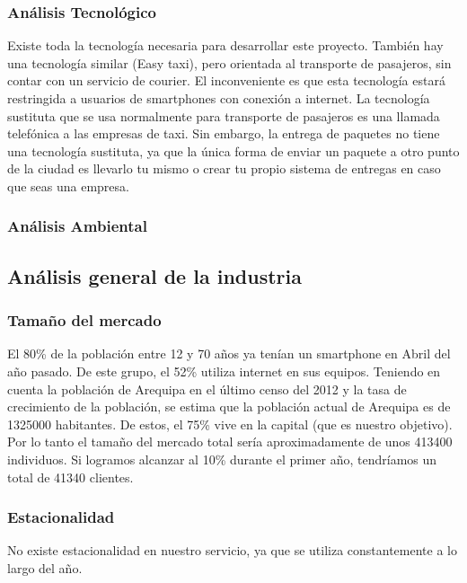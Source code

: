 \subsubsection{Análisis Tecnológico}
Existe toda la tecnología necesaria para desarrollar este proyecto. También hay una tecnología similar (Easy taxi), pero orientada al transporte de pasajeros, sin contar con un servicio de courier. El inconveniente es que esta tecnología estará restringida a usuarios de smartphones con conexión a internet. La tecnología sustituta que se usa normalmente para transporte de pasajeros es una llamada telefónica a las empresas de taxi. Sin embargo, la entrega de paquetes no tiene una tecnología sustituta, ya que la única forma de enviar un paquete a otro punto de la ciudad es llevarlo tu mismo o crear tu propio sistema de entregas en caso que seas una empresa.


\subsubsection{Análisis Ambiental}


\subsection{Análisis general de la industria}
\subsubsection{Tamaño del mercado}
El 80\% de la población entre 12 y 70 años ya tenían un smartphone en Abril del año pasado. De este grupo, el 52\% utiliza internet en sus equipos. Teniendo en cuenta la población de Arequipa en el último censo del 2012 y la tasa de crecimiento de la población, se estima que la población actual de Arequipa es de 1325000 habitantes. De estos, el 75\% vive en la capital (que es nuestro objetivo). Por lo tanto el tamaño del mercado total sería aproximadamente de unos 413400 individuos. Si logramos alcanzar al 10\% durante el primer año, tendríamos un total de 41340 clientes.

\subsubsection{Estacionalidad}
No existe estacionalidad en nuestro servicio, ya que se utiliza constantemente a lo largo del año.

